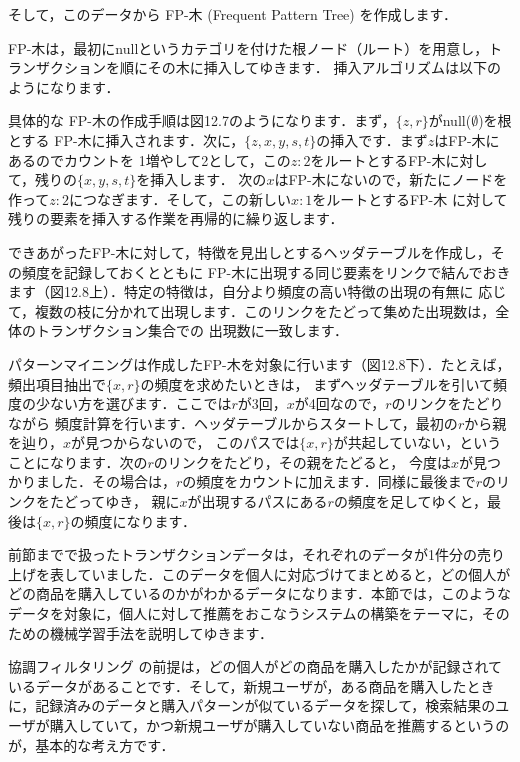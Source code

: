 そして，このデータから
FP-木 (Frequent Pattern Tree) 
を作成します．

FP-木は，最初にnullというカテゴリを付けた根ノード（ルート）を用意し，トランザクションを順にその木に挿入してゆきます．
挿入アルゴリズムは以下のようになります．


具体的な FP-木の作成手順は図12.7のようになります．まず，$\{z,r\}$がnull($\emptyset$)を根とする
FP-木に挿入されます．次に，$\{z,x,y,s,t\}$の挿入です．まず$z$はFP-木にあるのでカウントを
1増やして2として，この$z:2$をルートとするFP-木に対して，残りの$\{x,y,s,t\}$を挿入します．
次の$x$はFP-木にないので，新たにノードを作って$z:2$につなぎます．そして，この新しい$x:1$をルートとするFP-木
に対して残りの要素を挿入する作業を再帰的に繰り返します．


できあがったFP-木に対して，特徴を見出しとするヘッダテーブルを作成し，その頻度を記録しておくとともに
FP-木に出現する同じ要素をリンクで結んでおきます（図12.8上）．特定の特徴は，自分より頻度の高い特徴の出現の有無に
応じて，複数の枝に分かれて出現します．このリンクをたどって集めた出現数は，全体のトランザクション集合での
出現数に一致します．



パターンマイニングは作成したFP-木を対象に行います（図12.8下）．たとえば，頻出項目抽出で$\{x,r\}$の頻度を求めたいときは，
まずヘッダテーブルを引いて頻度の少ない方を選びます．ここでは$r$が3回，$x$が4回なので，$r$のリンクをたどりながら
頻度計算を行います．ヘッダテーブルからスタートして，最初の$r$から親を辿り，$x$が見つからないので，
このパスでは$\{x,r\}$が共起していない，ということになります．次の$r$のリンクをたどり，その親をたどると，
今度は$x$が見つかりました．その場合は，$r$の頻度をカウントに加えます．同様に最後まで$r$のリンクをたどってゆき，
親に$x$が出現するパスにある$r$の頻度を足してゆくと，最後は$\{x,r\}$の頻度になります．




前節までで扱ったトランザクションデータは，それぞれのデータが1件分の売り上げを表していました．このデータを個人に対応づけてまとめると，どの個人がどの商品を購入しているのかがわかるデータになります．本節では，このようなデータを対象に，個人に対して推薦をおこなうシステムの構築をテーマに，そのための機械学習手法を説明してゆきます．


協調フィルタリング
の前提は，どの個人がどの商品を購入したかが記録されているデータがあることです．そして，新規ユーザが，ある商品を購入したときに，記録済みのデータと購入パターンが似ているデータを探して，検索結果のユーザが購入していて，かつ新規ユーザが購入していない商品を推薦するというのが，基本的な考え方です．

